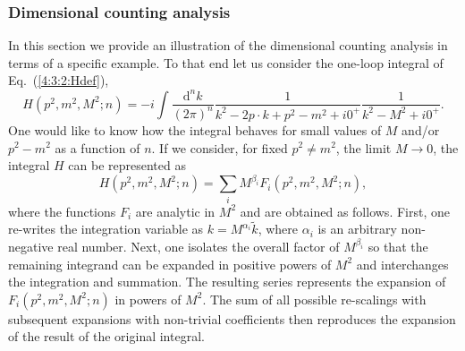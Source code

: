 \documentclass[twoside,12pt]{article}
\begin{document}
\subsubsection{Dimensional counting analysis}
\label{section_dimensional_counting_analysis}
   In this section we provide an illustration of the dimensional counting
analysis \cite{Gegelia:1994zz} in terms of a specific example.
   To that end let us consider the one-loop integral of Eq.~(\ref{4:3:2:Hdef}),
\begin{equation}
H(p^2,m^2,M^2;n)=
-i\int \frac{\mbox{d}^n k}{(2\pi)^n} \frac{1}{k^2-2p\cdot k
+p^2-m^2+i0^+}\frac{1}{k^2-M^2+i0^+}.
\end{equation}
   One would like to know how the integral behaves for small values of
$M$ and/or $p^2-m^2$ as a function of $n$.
   If we consider, for fixed $p^2\neq m^2$, the limit $M\to 0$, the
integral $H$ can be represented as
\begin{equation}
H(p^2,m^2,M^2;n)=\sum_i M^{\beta_i} F_i(p^2,m^2,M^2;n),
\label{ippsiexp}
\end{equation}
   where the functions $F_i$ are analytic in $M^2$ and are obtained
as follows.
   First, one re-writes the integration variable as
$k=M^{\alpha_i}\tilde k$, where $\alpha_i$ is an arbitrary
non-negative real number.
   Next, one isolates the overall factor of $M^{\beta_i}$ so
that the remaining integrand can be expanded in positive powers of
$M^2$ and interchanges the integration and summation.
   The resulting series represents the expansion of $F_i(p^2,m^2,M^2;n)$ in
powers of $M^2$.
   The sum of all possible re-scalings with subsequent expansions with
non-trivial coefficients then reproduces the expansion of the result
of the original integral.
\end{document}
